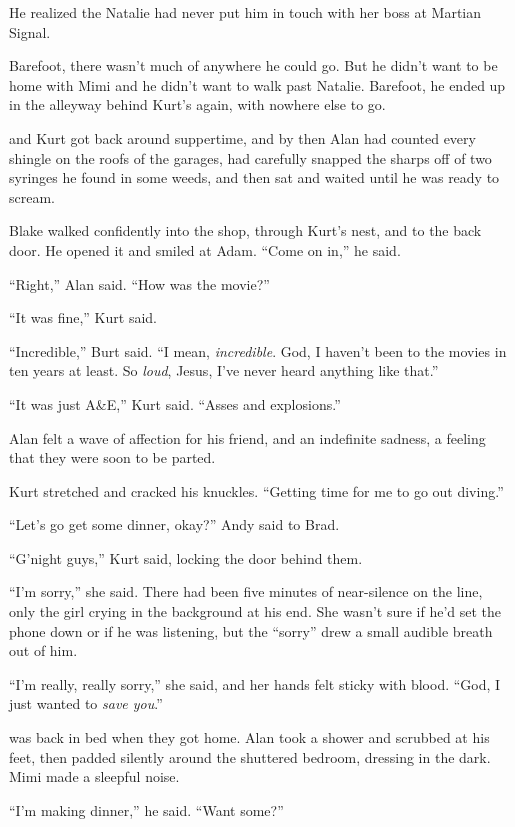 He realized the Natalie had never put him in touch with her boss at
Martian Signal. 

Barefoot, there wasn't much of anywhere he could go.  But he didn't
want to be home with Mimi and he didn't want to walk past Natalie. 
Barefoot, he ended up in the alleyway behind Kurt's again, with
nowhere else to go.

 and Kurt got back around suppertime, and by then Alan had
counted every shingle on the roofs of the garages, had carefully
snapped the sharps off of two syringes he found in some weeds, and
then sat and waited until he was ready to scream.

Blake walked confidently into the shop, through Kurt's nest, and to
the back door.  He opened it and smiled at Adam.  ``Come on in,'' he
said.

``Right,'' Alan said.  ``How was the movie?''

``It was fine,'' Kurt said.

``Incredible,'' Burt said.  ``I mean, \textit{incredible}.  God, I
haven't been to the movies in ten years at least.  So \textit{loud},
Jesus, I've never heard anything like that.''

``It was just A\&E,'' Kurt said.  ``Asses and explosions.''

Alan felt a wave of affection for his friend, and an indefinite
sadness, a feeling that they were soon to be parted.

Kurt stretched and cracked his knuckles.  ``Getting time for me to go
out diving.''

``Let's go get some dinner, okay?'' Andy said to Brad.

``G'night guys,'' Kurt said, locking the door behind them.

``I'm sorry,'' she said.  There had been five minutes of near-silence
on the line, only the girl crying in the background at his end.  She
wasn't sure if he'd set the phone down or if he was listening, but the
``sorry'' drew a small audible breath out of him.

``I'm really, really sorry,'' she said, and her hands felt sticky with
blood.  ``God, I just wanted to \textit{save you}.''

 was back in bed when they got home.  Alan took a shower and
scrubbed at his feet, then padded silently around the shuttered
bedroom, dressing in the dark.  Mimi made a sleepful noise.

``I'm making dinner,'' he said.  ``Want some?''


